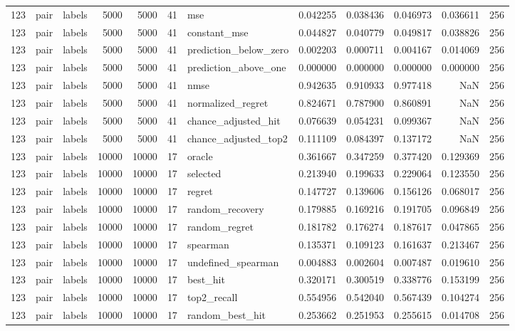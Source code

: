 \begin{tabular}{rllrrrlrrrrr}
123 & pair & labels & 5000 & 5000 & 41 & mse & 0.042255 & 0.038436 & 0.046973 & 0.036611 & 256 \\
123 & pair & labels & 5000 & 5000 & 41 & constant_mse & 0.044827 & 0.040779 & 0.049817 & 0.038826 & 256 \\
123 & pair & labels & 5000 & 5000 & 41 & prediction_below_zero & 0.002203 & 0.000711 & 0.004167 & 0.014069 & 256 \\
123 & pair & labels & 5000 & 5000 & 41 & prediction_above_one & 0.000000 & 0.000000 & 0.000000 & 0.000000 & 256 \\
123 & pair & labels & 5000 & 5000 & 41 & nmse & 0.942635 & 0.910933 & 0.977418 & NaN & 256 \\
123 & pair & labels & 5000 & 5000 & 41 & normalized_regret & 0.824671 & 0.787900 & 0.860891 & NaN & 256 \\
123 & pair & labels & 5000 & 5000 & 41 & chance_adjusted_hit & 0.076639 & 0.054231 & 0.099367 & NaN & 256 \\
123 & pair & labels & 5000 & 5000 & 41 & chance_adjusted_top2 & 0.111109 & 0.084397 & 0.137172 & NaN & 256 \\
123 & pair & labels & 10000 & 10000 & 17 & oracle & 0.361667 & 0.347259 & 0.377420 & 0.129369 & 256 \\
123 & pair & labels & 10000 & 10000 & 17 & selected & 0.213940 & 0.199633 & 0.229064 & 0.123550 & 256 \\
123 & pair & labels & 10000 & 10000 & 17 & regret & 0.147727 & 0.139606 & 0.156126 & 0.068017 & 256 \\
123 & pair & labels & 10000 & 10000 & 17 & random_recovery & 0.179885 & 0.169216 & 0.191705 & 0.096849 & 256 \\
123 & pair & labels & 10000 & 10000 & 17 & random_regret & 0.181782 & 0.176274 & 0.187617 & 0.047865 & 256 \\
123 & pair & labels & 10000 & 10000 & 17 & spearman & 0.135371 & 0.109123 & 0.161637 & 0.213467 & 256 \\
123 & pair & labels & 10000 & 10000 & 17 & undefined_spearman & 0.004883 & 0.002604 & 0.007487 & 0.019610 & 256 \\
123 & pair & labels & 10000 & 10000 & 17 & best_hit & 0.320171 & 0.300519 & 0.338776 & 0.153199 & 256 \\
123 & pair & labels & 10000 & 10000 & 17 & top2_recall & 0.554956 & 0.542040 & 0.567439 & 0.104274 & 256 \\
123 & pair & labels & 10000 & 10000 & 17 & random_best_hit & 0.253662 & 0.251953 & 0.255615 & 0.014708 & 256 \\

\end{tabular}
